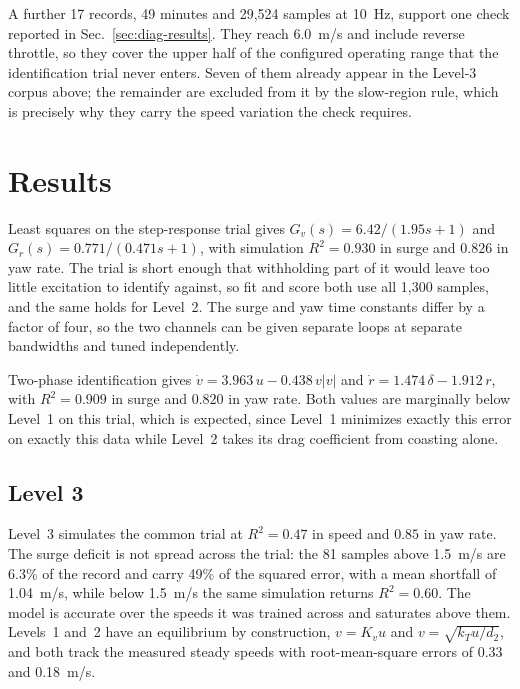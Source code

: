 \documentclass[conference]{IEEEtran}
\begin{document}
A further 17 records, 49 minutes and 29{,}524 samples at 10~Hz, support one check reported in Sec.~\ref{sec:diag-results}. They reach 6.0~m/s and include reverse throttle, so they cover the upper half of the configured operating range that the identification trial never enters. Seven of them already appear in the Level-3 corpus above; the remainder are excluded from it by the slow-region rule, which is precisely why they carry the speed variation the check requires.

\section{Results}
\label{sec:results}

Least squares on the step-response trial gives $G_v(s)=6.42/(1.95s+1)$ and $G_r(s)=0.771/(0.471s+1)$, with simulation $R^2=0.930$ in surge and $0.826$ in yaw rate. The trial is short enough that withholding part of it would leave too little excitation to identify against, so fit and score both use all 1{,}300 samples, and the same holds for Level~2. 
The surge and yaw time constants differ by a factor of four, so the two channels can be given separate loops at separate bandwidths and tuned independently.

Two-phase identification gives $\dot v = 3.963\,u - 0.438\,v|v|$ and $\dot r = 1.474\,\delta - 1.912\,r$, with $R^2=0.909$ in surge and $0.820$ in yaw rate. Both values are marginally below Level~1 on this trial, which is expected, since Level~1 minimizes exactly this error on exactly this data while Level~2 takes its drag coefficient from coasting alone.

\subsection{Level 3}
\label{sec:l3-results}

Level~3 simulates the common trial at $R^2=0.47$ in speed and $0.85$ in yaw rate.  The surge deficit is not spread across the trial: the 81 samples above 1.5~m/s are 6.3\% of the record and carry 49\% of the squared error, with a mean shortfall of 1.04~m/s, while below 1.5~m/s the same simulation returns $R^2=0.60$. The model is accurate over the speeds it was trained across and saturates above them. Levels~1 and~2 have an equilibrium by construction, $v=K_v u$ and $v=\sqrt{k_T u/d_2}$, and both track the measured steady speeds with root-mean-square errors of 0.33 and 0.18~m/s. 
\end{document}

